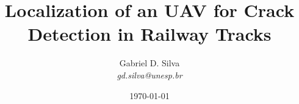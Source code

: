 \documentclass[aspectratio=43, 14pt]{beamer}
\title{Localization of an UAV for Crack Detection in Railway Tracks}
\author[Gabriel D. Silva]{Gabriel D. Silva \\ {\itshape\footnotesize gd.silva@unesp.br}}
\institute[FEIS/UNESP]{\includegraphics[scale=0.6]               
{figures/logos/feisunesp-centered-black.pdf}}
\date{\today}
\begin{document}
\begin{frame}                                                       
	\titlepage                                                      
\end{frame}                                                         
\begin{frame}                                                       
	\tableofcontents                                                
\end{frame}                                                         






\end{document}
